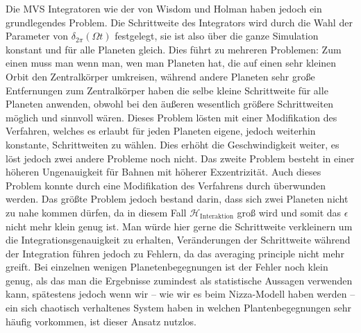 \documentclass[12pt,a4paper,twoside]{article}
\renewcommand{\H}{\mathcal H}
\begin{document}
Die MVS Integratoren wie der von Wisdom und Holman haben jedoch ein grundlegendes Problem. Die Schrittweite des Integrators wird durch die Wahl der Parameter von $\delta_{2\pi}(\Omega t)$ festgelegt, sie ist also über die ganze Simulation konstant und für alle Planeten gleich.
Dies führt zu mehreren Problemen: Zum einen muss man wenn man, wen man Planeten hat, die auf einen sehr kleinen Orbit den Zentralkörper umkreisen, während andere Planeten sehr große Entfernungen zum Zentralkörper haben die selbe kleine Schrittweite für alle Planeten anwenden, obwohl bei den äußeren wesentlich größere Schrittweiten möglich und sinnvoll wären. Dieses Problem lösten \cite{Saha1994} mit einer Modifikation des Verfahren, welches es erlaubt für jeden Planeten eigene, jedoch weiterhin konstante, Schrittweiten zu wählen.
Dies erhöht die Geschwindigkeit weiter, es löst jedoch zwei andere Probleme noch nicht. Das zweite Problem besteht in einer höheren Ungenauigkeit für Bahnen mit höherer Exzentrizität. Auch dieses Problem konnte durch eine Modifikation des Verfahrens durch \cite{Mikkola1997} überwunden werden.
Das größte Problem jedoch bestand darin, dass sich zwei Planeten nicht zu nahe kommen dürfen, da in diesem Fall $\H_{\mathrm{Interaktion}}$ groß wird und somit das $\epsilon$ nicht mehr klein genug ist. Man würde hier gerne die Schrittweite verkleinern um die Integrationsgenauigkeit zu erhalten, Veränderungen der Schrittweite während der Integration führen jedoch zu Fehlern, da das averaging principle nicht mehr greift.
Bei einzelnen wenigen Planetenbegegnungen ist der Fehler noch klein genug, als das man die Ergebnisse zumindest als statistische Aussagen verwenden kann\cite{Chambers1999},
 spätestens jedoch wenn wir – wie wir es beim Nizza-Modell haben werden – ein sich chaotisch verhaltenes System haben in welchen Plantenbegegnungen sehr häufig vorkommen, ist dieser Ansatz nutzlos.
\end{document}
